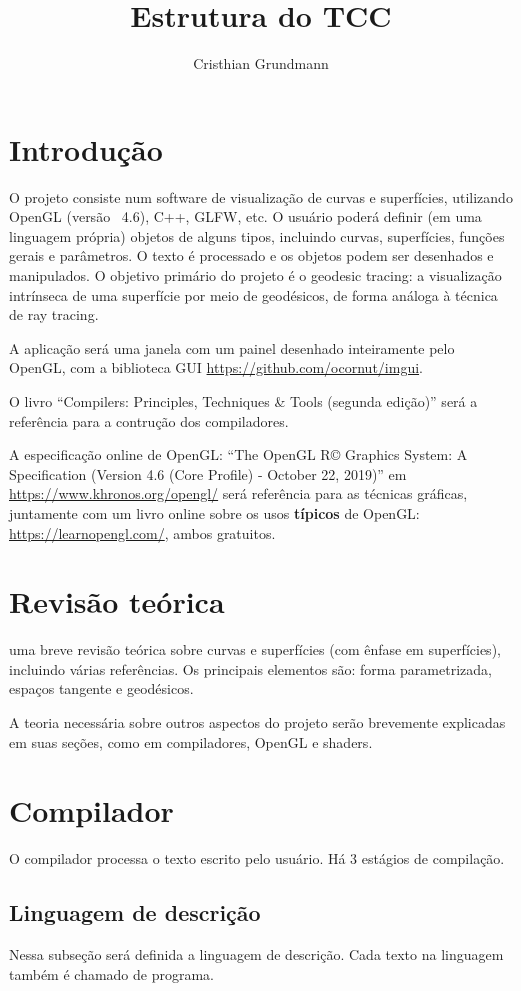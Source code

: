 \documentclass[10pt,a4paper]{article}
\title{Estrutura do TCC}
\author{Cristhian Grundmann}
\date{}
\begin{document}
\maketitle

\section{Introdução}
O projeto consiste num software de visualização de curvas e superfícies, utilizando OpenGL (versão ~4.6), C++, GLFW, etc.
O usuário poderá definir (em uma linguagem própria) objetos de alguns tipos, incluindo
curvas, superfícies, funções gerais e parâmetros. O texto é processado e os objetos podem ser desenhados e manipulados.
O objetivo primário do projeto é o geodesic tracing:
a visualização intrínseca de uma superfície por meio de geodésicos, de forma análoga à técnica de ray tracing.

A aplicação será uma janela com um painel desenhado inteiramente pelo OpenGL,
com a biblioteca GUI \url{https://github.com/ocornut/imgui}.

O livro ``Compilers: Principles, Techniques \& Tools (segunda edição)''
será a referência para a contrução dos compiladores.

A especificação online de OpenGL: ``The OpenGL R© Graphics System: A Specification
(Version 4.6 (Core Profile) - October 22, 2019)'' em \url{https://www.khronos.org/opengl/} 
será referência para as técnicas gráficas, juntamente com um livro online sobre os 
usos \textbf{típicos} de OpenGL: \url{https://learnopengl.com/}, ambos gratuitos.

\section{Revisão teórica}
uma breve revisão teórica sobre curvas e superfícies (com ênfase em superfícies), incluindo várias referências.
Os principais elementos são: forma parametrizada, espaços tangente e geodésicos.

A teoria necessária sobre outros aspectos do projeto serão brevemente explicadas em suas seções, como
em compiladores, OpenGL e shaders.

\section{Compilador}
O compilador processa o texto escrito pelo usuário. Há 3 estágios de compilação.

\subsection{Linguagem de descrição}
Nessa subseção será definida a linguagem de descrição. Cada texto na linguagem também é chamado de programa.
\end{document}
